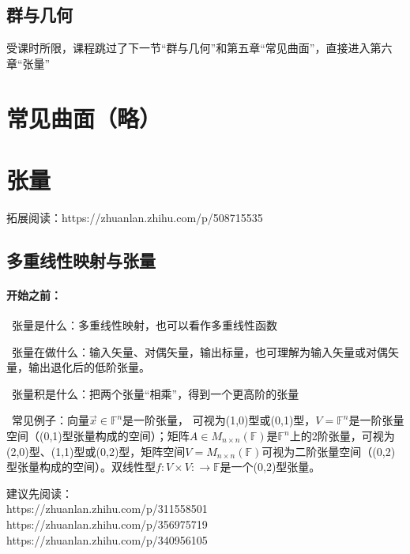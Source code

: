 \documentclass[zihao=5,UTF8]{report}
\def\F{\mathbb{F}}
\theoremstyle{mystyle} %
\begin{document}
\section{群与几何}
{\par\color{gray}
受课时所限，课程跳过了下一节“群与几何”和第五章“常见曲面”，直接进入第六章“张量”
\par}

\chapter{常见曲面（略）}\thispagestyle{fancy} 
\chapter{张量}

拓展阅读：https://zhuanlan.zhihu.com/p/508715535

\section{多重线性映射与张量}\thispagestyle{fancy} 

\subsubsection{开始之前：}
\par{}\ 张量是什么：多重线性映射，也可以看作多重线性函数    \par
{}\ 张量在做什么：输入矢量、对偶矢量，输出标量，也可理解为输入矢量或对偶矢量，输出退化后的低阶张量。    \par
{}\ 张量积是什么：把两个张量“相乘”，得到一个更高阶的张量    \par
{}\ 常见例子：向量$\vec{x} \in \F^n$是一阶张量， 可视为(1,0)型或(0,1)型，$V = \F^n$是一阶张量空间（(0,1)型张量构成的空间）；矩阵$A \in M_{n\times n}(\F)$是$\F^n$上的2阶张量，可视为(2,0)型、(1,1)型或(0,2)型，矩阵空间$V = M_{n\times n}(\F)$可视为二阶张量空间（(0,2)型张量构成的空间）。双线性型$f: V\times V: \longrightarrow \F$是一个(0,2)型张量。

\par\noindent
建议先阅读：\\ 
https://zhuanlan.zhihu.com/p/311558501\\
https://zhuanlan.zhihu.com/p/356975719\\ 
https://zhuanlan.zhihu.com/p/340956105\par
\end{document}
